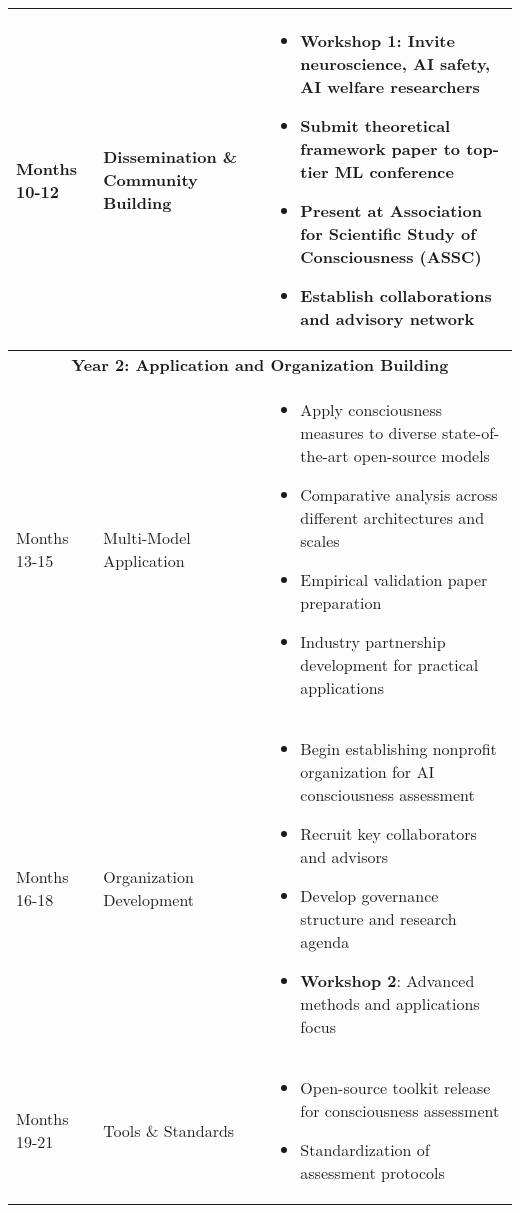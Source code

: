 \documentclass[11pt,a4paper]{article}
\begin{document}
\begin{table}[h]
\begin{tabular}{|l|l|p{9cm}|}
    \hline
    Months 10-12 & Dissemination \& Community Building & 
    \begin{itemize}[leftmargin=*,noitemsep,topsep=0pt]
        \item \textbf{Workshop 1}: Invite neuroscience, AI safety, AI welfare researchers
        \item Submit theoretical framework paper to top-tier ML conference
        \item Present at Association for Scientific Study of Consciousness (ASSC)
        \item Establish collaborations and advisory network
    \end{itemize} \\
    \hline
    \multicolumn{3}{|c|}{\textbf{Year 2: Application and Organization Building}} \\
    \hline
    Months 13-15 & Multi-Model Application & 
    \begin{itemize}[leftmargin=*,noitemsep,topsep=0pt]
        \item Apply consciousness measures to diverse state-of-the-art open-source models
        \item Comparative analysis across different architectures and scales
        \item Empirical validation paper preparation
        \item Industry partnership development for practical applications
    \end{itemize} \\
    \hline
    Months 16-18 & Organization Development & 
    \begin{itemize}[leftmargin=*,noitemsep,topsep=0pt]
        \item Begin establishing nonprofit organization for AI consciousness assessment
        \item Recruit key collaborators and advisors
        \item Develop governance structure and research agenda
        \item \textbf{Workshop 2}: Advanced methods and applications focus
    \end{itemize} \\
    \hline
    Months 19-21 & Tools \& Standards & 
    \begin{itemize}[leftmargin=*,noitemsep,topsep=0pt]
        \item Open-source toolkit release for consciousness assessment
        \item Standardization of assessment protocols

\end{itemize}
\end{tabular}
\end{table}
\end{document}
